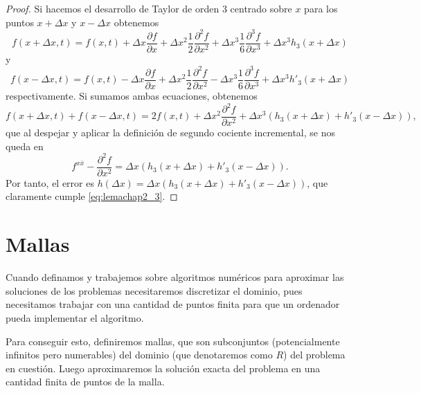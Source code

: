 \begin{proof}
	Si hacemos el desarrollo de Taylor de orden 3 centrado sobre $x$ para los puntos $x+\Delta x$ y $x-\Delta x$ obtenemos
	\begin{equation}
		f(x+\Delta x,t) = f(x,t) + \Delta x\frac{\partial f}{\partial x} + \Delta x^2 \frac{1}{2} \frac{\partial^2 f}{\partial x^2} + \Delta x^3 \frac{1}{6} \frac{\partial^3 f}{\partial x^3} + \Delta x^3 h_3(x+\Delta x)
	\end{equation}
	y
	\begin{equation}
		f(x-\Delta x,t) = f(x,t) - \Delta x\frac{\partial f}{\partial x} + \Delta x^2 \frac{1}{2} \frac{\partial^2 f}{\partial x^2} - \Delta x^3 \frac{1}{6} \frac{\partial^3 f}{\partial x^3} + \Delta x^3 h'_3(x+\Delta x)
	\end{equation}
	respectivamente. Si sumamos ambas ecuaciones, obtenemos
	\begin{equation}
	f(x+\Delta x,t) + f(x-\Delta x,t) = 2f(x,t) + \Delta x^2 \frac{\partial^2 f}{\partial x^2} + \Delta x^3(h_3(x+\Delta x) + h'_3(x-\Delta x)),
	\end{equation}
	que al despejar y aplicar la definición de segundo cociente incremental, se nos queda en
	\begin{equation}
		f^{x\bar{x}} - \frac{\partial^2 f}{\partial x^2} = \Delta x (h_3(x+\Delta x)+h'_3(x-\Delta x)).
	\end{equation}
	Por tanto, el error es $h(\Delta x) = \Delta x (h_3(x+\Delta x)+h'_3(x-\Delta x))$, que claramente cumple \eqref{eq:lemachap2_3}.
\end{proof}

\section{Mallas}\label{sec:malla}
Cuando definamos y trabajemos sobre algoritmos numéricos para aproximar las soluciones de los problemas necesitaremos discretizar el dominio, pues necesitamos trabajar con una cantidad de puntos finita para que un ordenador pueda implementar el algoritmo.

Para conseguir esto, definiremos mallas, que son subconjuntos (potencialmente infinitos pero numerables) del dominio (que denotaremos como $R$) del problema en cuestión. Luego aproximaremos la solución exacta del problema en una cantidad finita de puntos de la malla.

